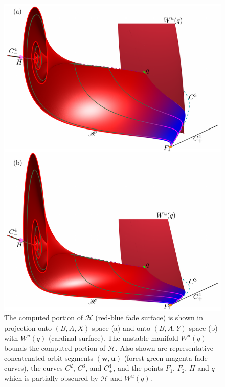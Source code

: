 \documentclass{ws-ijbc}
\begin{document}
\begin{figure}[t!]
\centering
\includegraphics[]{./figures/MKMO_12.pdf}
\caption{The computed portion of $\mathscr{H}$ (red-blue fade surface) is shown in projection onto $(B,A,X)$-space (a) and onto $(B,A,Y)$-space (b) with $W^u(q)$ (cardinal surface).  The unstable manifold $W^u(q)$ bounds the computed portion of $\mathscr{H}$.  Also shown are representative concatenated orbit segments $(\mathbf{w},\mathbf{u})$ (forest green-magenta fade curves), the curves $C^2$, $C^3$, and $C^4_\pm$, and the points $F_1$, $F_2$, $H$ and $q$ which is partially obscured by $\mathscr{H}$ and $W^u(q)$.}
\label{figure_12}
\end{figure}
\end{document}
